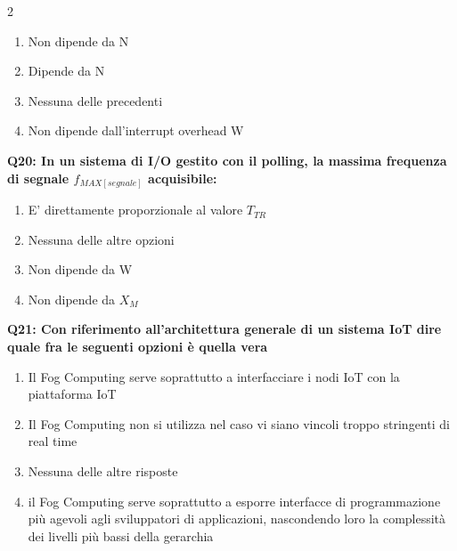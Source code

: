 \documentclass[10pt]{article}
\begin{document}
\begin{multicols}{2}
\begin{enumerate}[label=\arabic*.]
\item Non dipende da N
\item Dipende da N
\item Nessuna delle precedenti
\item Non dipende dall’interrupt overhead W
\end{enumerate}
\textbf{Q20: In un sistema di I/O gestito con il polling, la massima frequenza di segnale $f_{MAX[segnale]}$ acquisibile:}

\begin{enumerate}[label=\arabic*.]
\item E' direttamente proporzionale al valore $T_{TR}$
\item Nessuna delle altre opzioni
\item Non dipende da W
\item Non dipende da $X_M$
\end{enumerate}
\textbf{Q21: Con riferimento all’architettura generale di un sistema IoT dire quale fra le seguenti opzioni è quella vera}

\begin{enumerate}[label=\arabic*.]
\item Il Fog Computing serve soprattutto a interfacciare i nodi IoT con la piattaforma IoT
\item Il Fog Computing non si utilizza nel caso vi siano vincoli troppo stringenti di real time
\item Nessuna delle altre risposte
\item il Fog Computing serve soprattutto a esporre interfacce di programmazione più agevoli agli sviluppatori di applicazioni, nascondendo loro la complessità dei livelli più bassi della gerarchia
\end{enumerate}
\end{multicols}
\end{document}
